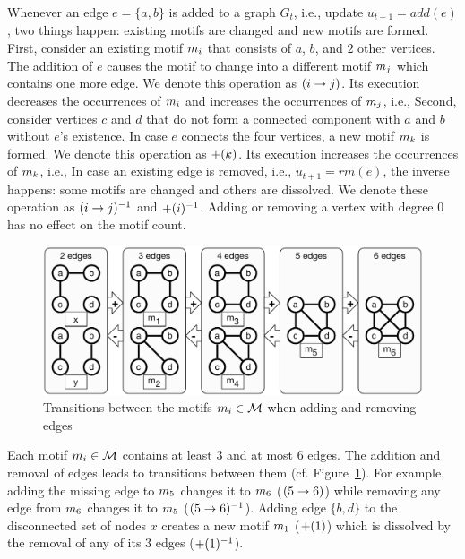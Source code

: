 \documentclass{article}
\begin{document}
Whenever an edge $e = \{a,b\}$ is added to a graph $G_t$, i.e., update $u_{t+1} = add(e)$, two things happen: existing motifs are changed and new motifs are formed.
First, consider an existing motif $m_{i}$ that consists of $a$, $b$, and $2$ other vertices.
The addition of $e$ causes the motif to change into a different motif $m_{j}$ which contains one more edge.
We denote this operation as $(i \rightarrow j)$.
Its execution decreases the occurrences of $m_{i}$ and increases the occurrences of $m_{j}$, i.e.,
Second, consider vertices $c$ and $d$ that do not form a connected component with $a$ and $b$ without $e$'s existence.
In case $e$ connects the four vertices, a new motif $m_{k}$ is formed.
We denote this operation as $+(k)$.
Its execution increases the occurrences of $m_{k}$, i.e.,
In case an existing edge is removed, i.e., $u_{t+1} = rm(e)$, the inverse happens: some motifs are changed and others are dissolved.
We denote these operation as $(i \rightarrow j)^{-1}$ and $+(i)^{-1}$.
Adding or removing a vertex with degree 0 has no effect on the motif count.



\begin{figure}
\centering
  \centering
  \includegraphics[width=1.0\textwidth]{idea-u}
  \caption{Transitions between the motifs $m_i \in {\cal M}$ when adding and removing edges}
  \label{fig:idea}
\end{figure}

Each motif $m_{i} \in {\cal M}$ contains at least 3 and at most 6 edges.
The addition and removal of edges leads to transitions between them (cf. Figure~\ref{fig:idea}).
For example, adding the missing edge to $m_{5}$ changes it to $m_{6}$ ($(5 \rightarrow 6)$) while removing any edge from $m_{6}$ changes it to $m_{5}$ ($(5 \rightarrow 6)^{-1}$).
Adding edge $\{b,d\}$ to the disconnected set of nodes $x$ creates a new motif $m_{1}$ ($+(1)$) which is dissolved by the removal of any of its 3 edges ($+(1)^{-1}$).
\end{document}
